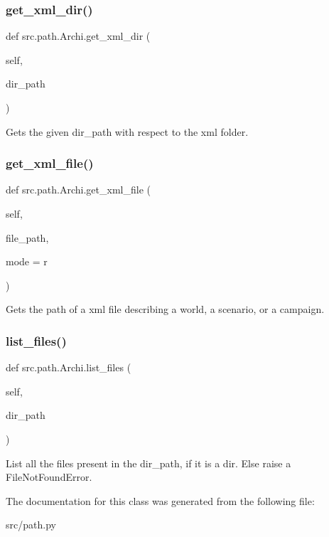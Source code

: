 \subsubsection{\texorpdfstring{get\+\_\+xml\+\_\+dir()}{get\_xml\_dir()}}
{\footnotesize\ttfamily def src.\+path.\+Archi.\+get\+\_\+xml\+\_\+dir (\begin{DoxyParamCaption}\item[{}]{self,  }\item[{}]{dir\+\_\+path }\end{DoxyParamCaption})}

\begin{DoxyVerb}Gets the given dir_path with respect to the xml folder.
\end{DoxyVerb}
 \hypertarget{classsrc_1_1path_1_1_archi_a3aae2cae1ec9db02047b419df0f6ada0}{}\label{classsrc_1_1path_1_1_archi_a3aae2cae1ec9db02047b419df0f6ada0} 
\subsubsection{\texorpdfstring{get\+\_\+xml\+\_\+file()}{get\_xml\_file()}}
{\footnotesize\ttfamily def src.\+path.\+Archi.\+get\+\_\+xml\+\_\+file (\begin{DoxyParamCaption}\item[{}]{self,  }\item[{}]{file\+\_\+path,  }\item[{}]{mode = {\ttfamily \textquotesingle{}r\textquotesingle{}} }\end{DoxyParamCaption})}

\begin{DoxyVerb}Gets the path of a xml file describing a world, a scenario, or a
campaign.
\end{DoxyVerb}
 \hypertarget{classsrc_1_1path_1_1_archi_a9c45a02901639a0d219c928dafe52530}{}\label{classsrc_1_1path_1_1_archi_a9c45a02901639a0d219c928dafe52530} 
\subsubsection{\texorpdfstring{list\+\_\+files()}{list\_files()}}
{\footnotesize\ttfamily def src.\+path.\+Archi.\+list\+\_\+files (\begin{DoxyParamCaption}\item[{}]{self,  }\item[{}]{dir\+\_\+path }\end{DoxyParamCaption})}

\begin{DoxyVerb}List all the files present in the dir_path, if it is a dir.
Else raise a FileNotFoundError.
\end{DoxyVerb}
 

The documentation for this class was generated from the following file\+:\begin{DoxyCompactItemize}
\item 
src/path.\+py\end{DoxyCompactItemize}
